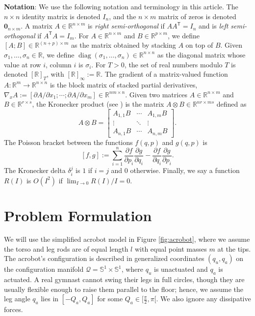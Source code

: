 \documentclass[journal,twoside,web, onecolumn, draftcls]{ieeecolor}
\DeclareMathOperator{\Diag}{diag}
\newcommand*{\diag}[1]{\Diag\left(#1\right)}
\newcommand*{\tpose}{^\mathsf{T}}
\newcommand*{\Rt}[1]{[\R]_{#1}}
\newcommand*{\R}{\mathbb{R}}
\newcommand*{\Sone}{\mathbb{S}^1}
\newcommand*{\Id}[1]{I_{#1}}
\newcommand*{\Zmat}[1]{\bm{0}_{#1}}
\newcommand*{\pdiff}[2]{\frac{\partial #1}{\partial #2}}
\begin{document}
\textbf{Notation}:
We use the following notation and terminology in this article.
The \(n \times n\) identity matrix is denoted \(\Id{n}\), and the \(n \times m\)
matrix of zeros is denoted \(\Zmat{n\times m}\).
A matrix \(A \in \R^{n \times m}\) is \textit{right semi-orthogonal} if
\(A A\tpose = \Id{n}\) and is \textit{left semi-orthogonal} if 
\(A\tpose A = \Id{m}\).
For \(A \in \R^{n\times m}\) and \(B \in \R^{p \times m}\),
we define \([A;B] \in \R^{(n+p)\times m}\) as the matrix obtained by stacking \(A\)
on top of \(B\). 
Given \(\sigma_1,\ldots,\sigma_n \in \R\), we define 
\(\diag{\sigma_1,\ldots,\sigma_n} \in \R^{n \times n}\) as the diagonal matrix
whose value at row \(i\), column \(i\) is \(\sigma_i\).
For \(T > 0\), the set of real numbers modulo \(T\) is denoted \(\Rt{T}\), with
\(\Rt{\infty} := \R\).
The gradient of a matrix-valued function 
\(A : \R^m \rightarrow \R^{n\times n}\) is the block matrix of stacked partial
derivatives, 
\(\nabla_xA := [\partial A/\partial x_1; \cdots; \partial A/\partial x_m] \in
\R^{nm \times n}\).
Given two matrices \(A \in \R^{n \times m}\) and \(B \in \R^{r \times s}\), the
Kronecker product (see \cite{kronprod}) is the matrix  
\(A \otimes B \in \R^{nr \times ms}\)  defined as
\begin{equation}\label{eqn:kronprod}
    A \otimes B = \begin{bmatrix}
        A_{1,1}B & \cdots & A_{1,m} B \\
        \vdots & \ddots & \vdots \\
        A_{n,1} B & \cdots & A_{n,m} B
    \end{bmatrix} 
    .
\end{equation}
The Poisson bracket \cite{landau_mechanics} between the functions
\(f(q,p)\) and \(g(q,p)\) is
\begin{equation}\label{eqn:poisson-bracket}
    [f,g] := \sum \limits_{i=1}^n \pdiff{f}{p_i}\pdiff{g}{q_i} - 
        \pdiff{f}{q_i}\pdiff{g}{p_i}
    .
\end{equation}
The Kronecker delta \(\delta_i^j\) is \(1\) if \(i = j\) and \(0\)
otherwise.
Finally, we say a function \(R(I)\) is \(O(I^2)\)
if \(\lim_{I \to 0} R(I)/I = 0\).

\section{Problem Formulation}\label{sec:problem-formulation}
We will use the simplified acrobot model in Figure
\ref{fig:acrobot}, where we assume the torso and leg rods are of
equal length \(l\) with equal point masses \(m\) at the tips.
The acrobot's configuration is described in generalized coordinates
\((q_u,q_a)\) on the configuration manifold 
\(\mathcal{Q} = \Sone \times \Sone\), where \(q_u\) is unactuated and 
\(q_a\) is actuated.
A real gymnast cannot swing their legs in full circles, though they
are usually flexible enough to raise them parallel to the floor;
hence, we assume the leg angle \(q_a\) lies in \([-Q_a, Q_a]\) for some
\(Q_a \in [\frac{\pi}{2}, \pi[\). 
We also ignore any dissipative forces.
\end{document}
